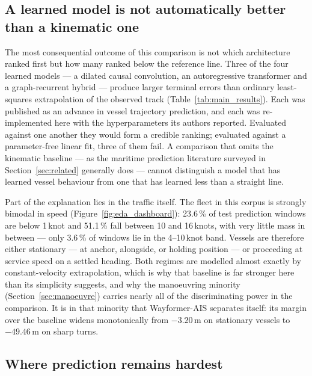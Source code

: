 \documentclass[12pt, a4paper]{article}
\begin{document}
\subsection{A learned model is not automatically better than a kinematic one}

  The most consequential outcome of this comparison is not which architecture
  ranked first but how many ranked below the reference line.  Three of the four
  learned models --- a dilated causal convolution, an autoregressive transformer
  and a graph-recurrent hybrid --- produce larger terminal errors than ordinary
  least-squares extrapolation of the observed track
  (Table~\ref{tab:main_results}).  Each was published as an advance in vessel
  trajectory prediction, and each was re-implemented here with the hyperparameters
  its authors reported.  Evaluated against one another they would form a credible
  ranking; evaluated against a parameter-free linear fit, three of them fail.
  A comparison that omits the kinematic baseline --- as the maritime prediction
  literature surveyed in Section~\ref{sec:related} generally does --- cannot
  distinguish a model that has learned vessel behaviour from one that has learned
  less than a straight line.

  Part of the explanation lies in the traffic itself.  The fleet in this corpus
  is strongly bimodal in speed (Figure~\ref{fig:eda_dashboard}): 23.6\,\% of
  test prediction windows are below 1\,knot and 51.1\,\% fall between 10 and
  16\,knots, with very little mass in between --- only 3.6\,\% of windows lie
  in the 4--10\,knot band.  Vessels are therefore either stationary --- at anchor,
  alongside, or holding position --- or proceeding at service speed on a settled
  heading.  Both regimes are modelled almost exactly by constant-velocity
  extrapolation, which is why that baseline is far stronger here than its
  simplicity suggests, and why the manoeuvring minority
  (Section~\ref{sec:manoeuvre}) carries nearly all of the discriminating power in
  the comparison.  It is in that minority that Wayformer-AIS separates itself:
  its margin over the baseline widens monotonically from $-3.20$\,m on stationary
  vessels to $-49.46$\,m on sharp turns.

  \subsection{Where prediction remains hardest}
\end{document}
